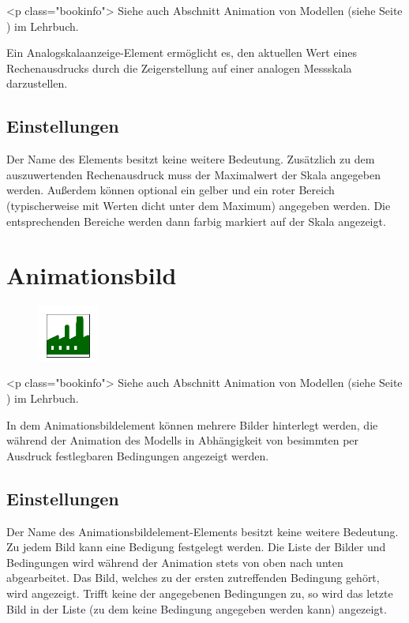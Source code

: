 <p class="bookinfo">
Siehe auch Abschnitt Animation von Modellen (siehe Seite \pageref{ref:book:5.4.3}) im Lehrbuch.

Ein Analogskalaanzeige-Element ermöglicht es, den aktuellen Wert eines Rechenausdrucks
durch die Zeigerstellung auf einer analogen Messskala darzustellen.

\subsection*{Einstellungen}

Der Name des Elements besitzt keine weitere Bedeutung.
Zusätzlich zu dem auszuwertenden Rechenausdruck muss
der Maximalwert der Skala angegeben werden. Außerdem können
optional ein gelber und ein roter Bereich (typischerweise
mit Werten dicht unter dem Maximum) angegeben werden. Die
entsprechenden Bereiche werden dann farbig markiert auf
der Skala angezeigt.


\section{Animationsbild}
\label{ref:ModelElementAnimationImage}

\begin{figure}
\vspace{-22pt}
\includegraphics[width=2cm]{imageModelElementAnimationImage.png}
\vspace{-22pt}
\end{figure}

<p class="bookinfo">
Siehe auch Abschnitt Animation von Modellen (siehe Seite \pageref{ref:book:5.4.3}) im Lehrbuch.

In dem Animationsbildelement können mehrere Bilder hinterlegt werden, die während der
Animation des Modells in Abhängigkeit von besimmten per Ausdruck festlegbaren
Bedingungen angezeigt werden.

\subsection*{Einstellungen}

Der Name des Animationsbildelement-Elements besitzt keine weitere Bedeutung. 
Zu jedem Bild kann eine Bedigung festgelegt werden. Die Liste der Bilder und
Bedingungen wird während der Animation stets von oben nach unten abgearbeitet.
Das Bild, welches zu der ersten zutreffenden Bedingung gehört, wird angezeigt.
Trifft keine der angegebenen Bedingungen zu, so wird das letzte Bild in der
Liste (zu dem keine Bedingung angegeben werden kann) angezeigt.


